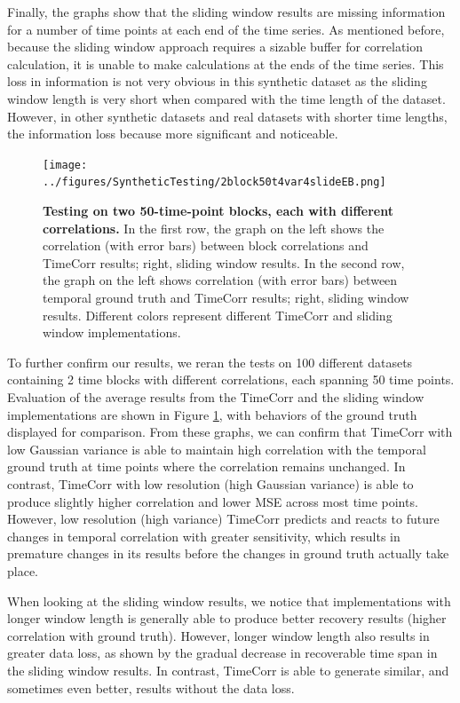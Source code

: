 \documentclass[11pt]{article}
\begin{document}
Finally, the graphs show that the sliding window results are missing information for a number of time points at each end of the time series. As mentioned before, because the sliding window approach requires a sizable buffer for correlation calculation, it is unable to make calculations at the ends of the time series. This loss in information is not very obvious in this synthetic dataset as the sliding window length is very short when compared with the time length of the dataset. However, in other synthetic datasets and real datasets with shorter time lengths, the information loss because more significant and noticeable.

\begin{figure}[!htb]
\texttt{[image: ../figures/SyntheticTesting/2block50t4var4slideEB.png]}
\caption{\textbf{Testing on two 50-time-point blocks, each with different correlations.} In the first row, the graph on the left shows the correlation (with error bars) between block correlations and TimeCorr results; right, sliding window results. In the second row, the graph on the left shows correlation (with error bars) between temporal ground truth and TimeCorr results; right, sliding window results. Different colors represent different TimeCorr and sliding window implementations.}
\label{fig:2block50t}
\end{figure}

To further confirm our results, we reran the tests on 100 different datasets containing 2 time blocks with different correlations, each spanning 50 time points. Evaluation of the average results from the TimeCorr and the sliding window implementations are shown in Figure \ref{fig:2block50t}, with behaviors of the ground truth displayed for comparison. From these graphs, we can confirm that TimeCorr with low Gaussian variance is able to maintain high correlation with the temporal ground truth at time points where the correlation remains unchanged. In contrast, TimeCorr with low resolution (high Gaussian variance) is able to produce slightly higher correlation and lower MSE across most time points. However, low resolution (high variance) TimeCorr predicts and reacts to future changes in temporal correlation with greater sensitivity, which results in premature changes in its results before the changes in ground truth actually take place.

When looking at the sliding window results, we notice that implementations with longer window length is generally able to produce better recovery results (higher correlation with ground truth). However, longer window length also results in greater data loss, as shown by the gradual decrease in recoverable time span in the sliding window results. In contrast, TimeCorr is able to generate similar, and sometimes even better, results without the data loss.
\end{document}
